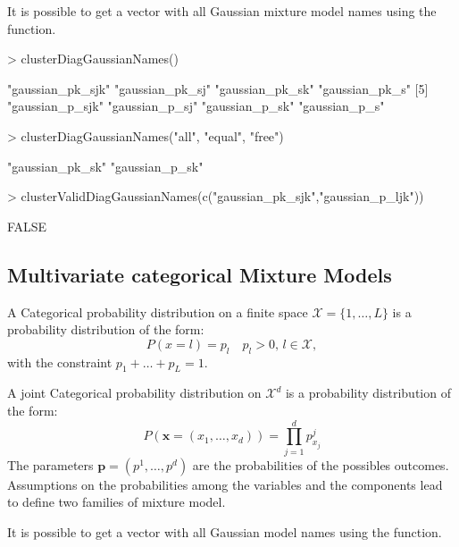 \documentclass[shortnames,nojss,article]{jss}
\newcommand{\Xd}{{\mathcal{X}^d}}
\newcommand{\bp}{\mathbf{p}}
\newcommand{\bx}{\mathbf{x}}
\begin{document}
It is possible to get a vector with all Gaussian mixture model names using the
 function.

\begin{Schunk}
\begin{Sinput}
> clusterDiagGaussianNames()
\end{Sinput}
\begin{Soutput}
[1] "gaussian_pk_sjk" "gaussian_pk_sj"  "gaussian_pk_sk"  "gaussian_pk_s"  
[5] "gaussian_p_sjk"  "gaussian_p_sj"   "gaussian_p_sk"   "gaussian_p_s"   
\end{Soutput}
\begin{Sinput}
> clusterDiagGaussianNames("all", "equal", "free")
\end{Sinput}
\begin{Soutput}
[1] "gaussian_pk_sk" "gaussian_p_sk" 
\end{Soutput}
\begin{Sinput}
> clusterValidDiagGaussianNames(c("gaussian_pk_sjk","gaussian_p_ljk"))
\end{Sinput}
\begin{Soutput}
[1] FALSE
\end{Soutput}
\end{Schunk}

\subsection{Multivariate categorical Mixture Models}
\label{subsec:Categorical}

A Categorical probability distribution on a finite space
$\mathcal{X} = \{1,\ldots,L\}$ is a probability distribution of the form:
\begin{equation}\label{law::categorical}
P(x=l) = p_l \quad p_l>0,\, l\in \mathcal{X},
\end{equation}
with the constraint $p_1+\ldots+p_L = 1.$

A joint Categorical probability distribution on $\Xd$ is a probability
distribution of the form:
\begin{equation}\label{law::joint-categorical-probability}
P(\bx=(x_1,\ldots,x_d)) = \prod_{j=1}^d p^j_{x_j}
\end{equation}
The parameters $\bp=(p^1,\ldots,p^d)$ are the probabilities of the possibles
outcomes. Assumptions on the probabilities among the variables and the
components lead to define two families of mixture model.

It is possible to get a vector with all Gaussian model names using the
 function.
\end{document}
